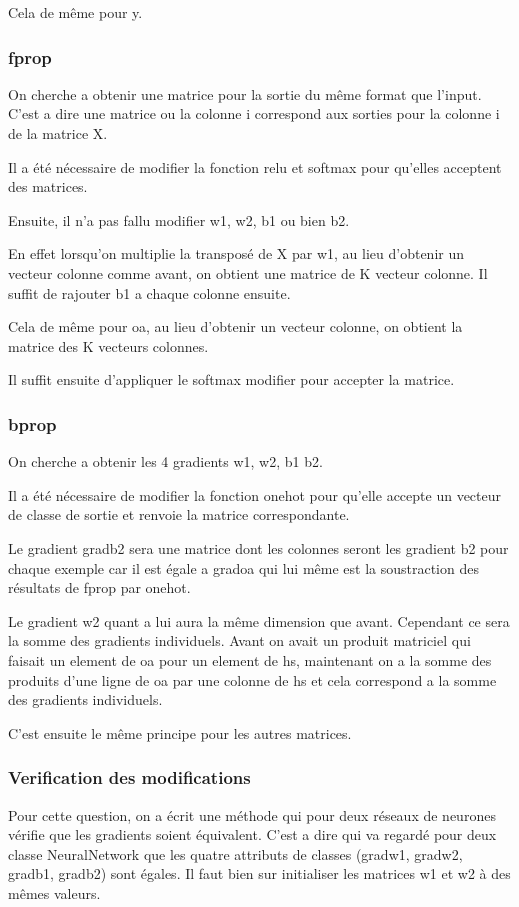 \documentclass[a4paper,11pt]{article}
\begin{document}
Cela de même pour y.

\subsubsection{fprop}

On cherche a obtenir une matrice pour la sortie du même format que l'input. C'est a dire une matrice ou la colonne i correspond aux sorties pour la colonne i de la matrice X.

Il a été nécessaire de modifier la fonction relu et softmax pour qu'elles acceptent des matrices.

Ensuite, il n'a pas fallu modifier w1, w2, b1 ou bien b2.

En effet lorsqu'on multiplie la transposé de X par w1, au lieu d'obtenir un vecteur colonne comme avant, on obtient une matrice de K vecteur colonne. Il suffit de rajouter b1 a chaque colonne ensuite.

Cela de même pour oa, au lieu d'obtenir un vecteur colonne, on obtient la matrice des K vecteurs colonnes.


Il suffit ensuite d'appliquer le softmax modifier pour accepter la matrice.
\subsubsection{bprop}

On cherche a obtenir les 4 gradients  w1, w2, b1 b2.

Il a été nécessaire de modifier la fonction onehot pour qu'elle accepte un vecteur de classe de sortie et renvoie la matrice correspondante.

Le gradient gradb2 sera une matrice dont les colonnes seront les gradient b2 pour chaque exemple car il est égale a gradoa qui lui même est la soustraction des résultats de fprop par onehot.

Le gradient w2 quant a lui aura la même dimension que avant. Cependant ce sera la somme des gradients individuels. Avant on avait un produit matriciel qui faisait un element de oa pour un element de hs, maintenant on a la somme des produits d'une ligne de oa par une colonne de hs et cela correspond a la somme des gradients individuels.

C'est ensuite le même principe pour les autres matrices.

\subsubsection{Verification des modifications}
Pour cette question, on a écrit une méthode qui pour deux réseaux de neurones vérifie que les gradients soient équivalent. C'est a dire qui va regardé pour deux classe NeuralNetwork que les quatre attributs de classes (gradw1, gradw2, gradb1, gradb2) sont égales. Il faut bien sur initialiser les matrices w1 et w2 à des mêmes valeurs.
\end{document}
